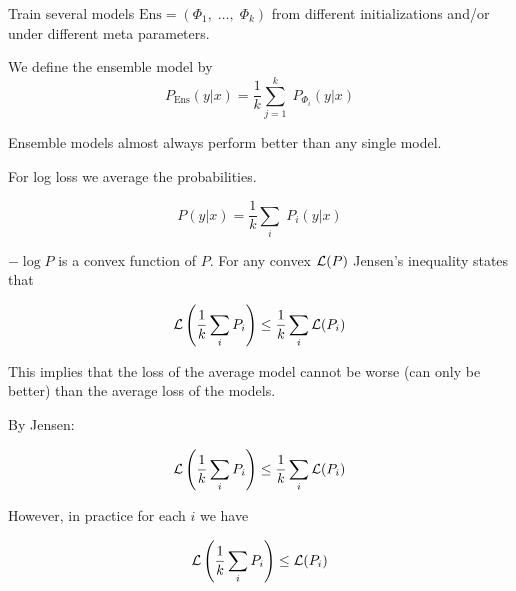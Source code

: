 {

Train several models $\mathrm{Ens} = (\Phi_1,\;\ldots,\; \Phi_k)$ from different initializations and/or under different meta parameters.

\vfill
We define the ensemble model by
$$P_\mathrm{Ens}(y|x) = \frac{1}{k} \sum_{j=1}^k\; P_{\Phi_i}(y|x)$$

\vfill
Ensemble models almost always perform better than any single model.


\vfill
{}

For log loss we average the probabilities.

\vfill
$$P(y|x) = \frac{1}{k} \sum_i \;P_i(y|x)$$

\vfill
$- \log P$ is a convex function of $P$.  For any convex ${\cal L}(P)$ Jensen's inequality states that

$${\cal L}\left(\frac{1}{k} \sum_i P_i\right) \leq \frac{1}{k} \sum_i {\cal L}(P_i)$$

\vfill
This implies that the loss of the average model cannot be worse (can only be better) than the average loss of the models.

\vfill
{}

By Jensen:

$${\cal L}\left(\frac{1}{k} \sum_i P_i\right) \leq \frac{1}{k} \sum_i {\cal L}(P_i)$$

\vfill
However, in practice for each $i$ we have

$${\cal L}\left(\frac{1}{k} \sum_i P_i\right) \leq {\cal L}(P_i)$$

}
